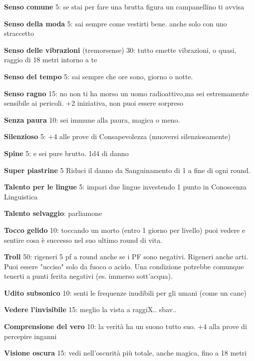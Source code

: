 \documentclass[a4paper,11pt,twoside,openany]{book}
\begin{document}
\textbf{Senso comune} 5: se stai per fare una brutta figura un campanellino ti avvisa

\textbf{Senso della moda} 5: sai sempre come vestirti bene. anche solo con uno straccetto

\textbf{Senso delle vibrazioni}   (tremorsense) 30: tutto emette vibrazioni, o quasi, raggio di 18 metri intorno a te

\textbf{Senso del tempo} 5: sai sempre che ore sono, giorno o notte.

\textbf{Senso ragno} 15: no non ti ha morso un uomo radioattivo,ma sei estremamente sensibile ai pericoli. +2 iniziativa, non puoi essere sorpreso

\textbf{Senza paura} 10: sei immune alla paura, magica o meno.

\textbf{Silenzioso} 5: +4 alle prove di Consapevolezza (muoversi silenziosamente)

\textbf{Spine} 5: e sei pure brutto. 1d4 di danno

\textbf{Super piastrine} 5 Riduci il danno da Sanguinamento di 1 a fine di ogni round.

\textbf{Talento per le lingue} 5: impari due lingue investendo 1 punto in Conoscenza Linguistica

\textbf{Talento selvaggio}: parliamone

\textbf{Tocco gelido} 10: toccando un morto (entro 1 giorno per livello) puoi vedere e sentire cosa è successo nel suo ultimo round di vita.

\textbf{Troll} 50: rigeneri 5 pf a round anche se i PF sono negativi. Rigeneri anche arti. Puoi essere "ucciso" solo da fuoco o acido. Una condizione potrebbe comunque tenerti a punti ferita negativi (es. immerso sott'acqua).

\textbf{Udito subsonico} 10: senti le frequenze inudibili per gli umani (come un cane)

\textbf{Vedere l'invisibile} 15: meglio la vista a raggiX.. sbav..

\textbf{Comprensione del vero} 10: la verità ha un suono tutto suo. +4 alla prove di percepire inganni

\textbf{Visione oscura} 15: vedi nell'oscurità più totale, anche magica, fino a 18 metri
\end{document}
